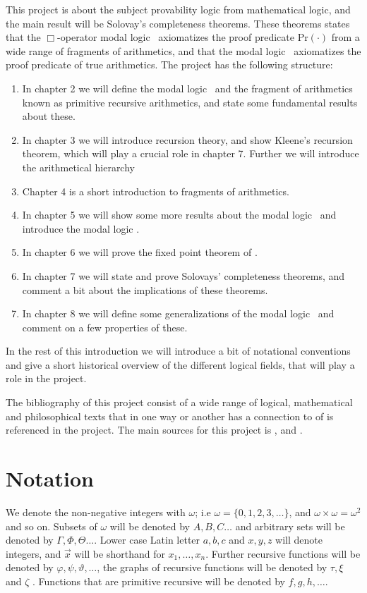 \documentclass[../main.tex]{subfiles}
\begin{document}
This project is about the subject provability logic from mathematical logic,
and the main result will be Solovay's completeness theorems. These theorems
states that the $\Box$-operator  modal logic \GL\ axiomatizes the proof
predicate $\text{Pr}(\cdot)$ from a wide range of fragments of arithmetics, and
that the modal logic \GLS\ axiomatizes the proof predicate of true arithmetics.
The project has the following structure: 
\begin{enumerate}
	\item In chapter 2 we will define the modal logic \GL\ and the
		fragment of arithmetics known as primitive recursive
		arithmetics, and state some fundamental results about these.
	\item In chapter 3 we will introduce recursion theory, and show
		Kleene's recursion theorem, which will play a crucial role in
		chapter 7. Further we will introduce the
		arithmetical hierarchy 
	\item Chapter 4 is a short introduction to fragments of arithmetics.
	\item In chapter 5 we will show some more results about the modal logic \GL\
		and introduce the modal logic \GLS.
	\item In chapter 6 we will prove the fixed point theorem of \GL.
	\item In chapter 7 we will state and prove Solovays' completeness
		theorems, and comment a bit about the implications of these
		theorems.
	\item In chapter 8 we will define some generalizations of the modal
		logic \GL\ and comment on a few properties of these.
\end{enumerate}

In the rest of this introduction we will introduce a bit of notational
conventions and give a short historical overview of the different logical
fields, that will play a role in the project.

The bibliography of this project consist of a wide range of logical,
mathematical and philosophical texts that in one way or another has a
connection to of is referenced in the project. The main sources for this project
is \cite{Smor1985}, \cite{Boolos1993} and \cite{Soare1987}.

\section{Notation}

We denote the non-negative integers with $\omega$; i.e
$\omega=\{0,1,2,3,\ldots\}$, and $\omega\times\omega=\omega^2$ and so on.
Subsets of $\omega$ will be denoted by $A,B,C\ldots$ and arbitrary sets will be
denoted by
$\Gamma,\Phi,\Theta\ldots$. Lower case Latin letter $a,b,c$ and $x,y,z$ will
denote integers, and $\vec{x}$ will be shorthand for $x_1,\ldots,x_n$. Further recursive functions will be denoted by
$\varphi,\psi,\vartheta,\ldots$, the graphs of recursive functions will be
denoted by $\tau,\xi$ and $\zeta$ . Functions that are primitive recursive will be denoted by
$f,g,h,\ldots$. 
\end{document}
